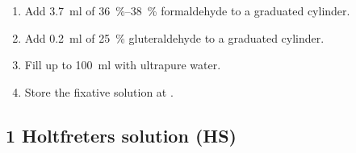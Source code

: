 \documentclass[12pt]{report}
\begin{document}
\begin{enumerate}
	\item Add \qty{3.7}{\ml} of \qtyrange{36}{38}{\percent} formaldehyde to a graduated cylinder.
	\item Add \qty{0.2}{\ml} of \qty{25}{\percent} gluteraldehyde to a graduated cylinder.
	\item Fill up to \qty{100}{\ml} with ultrapure water.
	\item Store the fixative solution at \fourdegree.
\end{enumerate}

\subsection*{1\per{} Holtfreter\curlyapostrophe s solution (HS)}
\end{document}
